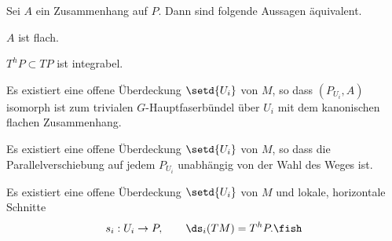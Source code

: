 \documentclass[%
	paper=a5,%
	fleqn,%
	DIV=18,%
	BCOR=0mm,
	fontsize=11pt,
	titlepage=false,%
	bibliography=totoc,
	DIV=18,%
	twoside=true,
	pdftitle=Riemannsche Geometrie,
	pdfauthor=Uwe Semmelmann,
	numbers=noendperiod]%
	{scrbook}
\begin{document}
\begin{prop}
Sei $A$ ein Zusammenhang auf $P$. Dann sind folgende Aussagen äquivalent.
\begin{equivenum}
\item $A$ ist flach.
\item $T^hP \subset TP$ ist integrabel.
\item Es existiert eine offene Überdeckung $\setd{U_i}$ von $M$, so dass
$(P_{U_i},A)$ isomorph ist zum trivialen $G$-Hauptfaserbündel über $U_i$ mit dem
kanonischen flachen Zusammenhang.
\item Es existiert eine offene Überdeckung $\setd{U_i}$ von $M$, so dass die
Parallelverschiebung auf jedem $P_{U_i}$ unabhängig von der Wahl des Weges
ist.
\item Es existiert eine offene Überdeckung $\setd{U_i}$ von $M$ und lokale,
horizontale Schnitte
\begin{align*}
s_i : U_i \to P,\qquad \ds_i(TM) = T^hP.\fish
\end{align*}
\end{equivenum}
\end{prop}
\end{document}
